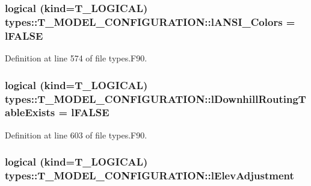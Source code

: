\hypertarget{typetypes_1_1_t___m_o_d_e_l___c_o_n_f_i_g_u_r_a_t_i_o_n_af2275fb1449a5289ec011bd40950abd4}{
\subsubsection[{lANSI\_\-Colors}]{\setlength{\rightskip}{0pt plus 5cm}logical (kind={\bf T\_\-LOGICAL}) {\bf types::T\_\-MODEL\_\-CONFIGURATION::lANSI\_\-Colors} = {\bf lFALSE}}}
\label{typetypes_1_1_t___m_o_d_e_l___c_o_n_f_i_g_u_r_a_t_i_o_n_af2275fb1449a5289ec011bd40950abd4}


Definition at line 574 of file types.F90.

\hypertarget{typetypes_1_1_t___m_o_d_e_l___c_o_n_f_i_g_u_r_a_t_i_o_n_a46e0f6a899f46179cc5649de5ed951f0}{
\subsubsection[{lDownhillRoutingTableExists}]{\setlength{\rightskip}{0pt plus 5cm}logical (kind={\bf T\_\-LOGICAL}) {\bf types::T\_\-MODEL\_\-CONFIGURATION::lDownhillRoutingTableExists} = {\bf lFALSE}}}
\label{typetypes_1_1_t___m_o_d_e_l___c_o_n_f_i_g_u_r_a_t_i_o_n_a46e0f6a899f46179cc5649de5ed951f0}


Definition at line 603 of file types.F90.

\hypertarget{typetypes_1_1_t___m_o_d_e_l___c_o_n_f_i_g_u_r_a_t_i_o_n_ae295b00bee178bd2c6265333c134f76c}{
\subsubsection[{lElevAdjustment}]{\setlength{\rightskip}{0pt plus 5cm}logical (kind={\bf T\_\-LOGICAL}) {\bf types::T\_\-MODEL\_\-CONFIGURATION::lElevAdjustment}}}
\label{typetypes_1_1_t___m_o_d_e_l___c_o_n_f_i_g_u_r_a_t_i_o_n_ae295b00bee178bd2c6265333c134f76c}


